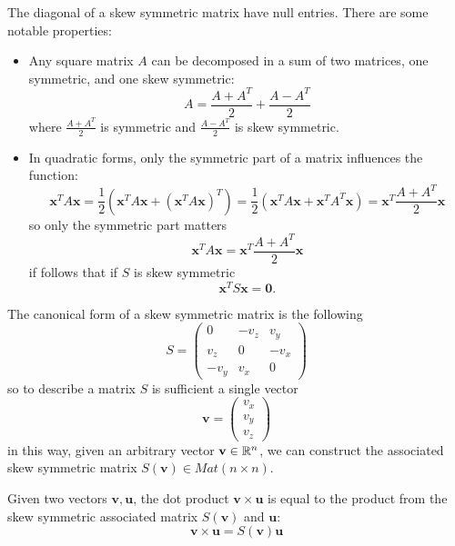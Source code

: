 \documentclass[10pt, letterpaper]{report}
\begin{document}
The diagonal of a skew symmetric matrix have null entries. There are some notable properties:\begin{itemize}
    \item Any square matrix $A$ can be decomposed in a sum of two matrices, one symmetric, and one skew symmetric:\begin{equation}
        A=\frac{A+A^T}{2}+\frac{A-A^T}{2}
    \end{equation}
    where $\frac{A+A^T}{2}$ is symmetric and $\frac{A-A^T}{2}$ is skew symmetric. 
    \item In quadratic forms, only the symmetric part of a matrix influences the function:\begin{equation}
        \mathbf x^T A \mathbf x = \frac{1}{2}(\mathbf x^T A \mathbf x+(\mathbf x^T A \mathbf x)^T)=\frac{1}{2}(\mathbf x^T A \mathbf x+\mathbf x^T A^T \mathbf x)=\mathbf x^T\frac{A+A^T}{2}\mathbf x
    \end{equation}
    so only the symmetric part matters\begin{equation}
        \mathbf x^T A\mathbf x=\mathbf x^T\frac{A+A^T}{2}\mathbf x
    \end{equation}
    if follows that if $S$ is skew symmetric \begin{equation}
        \mathbf x^T S\mathbf x=\mathbf 0.   
    \end{equation}
\end{itemize}
The canonical form of a skew symmetric matrix is the following\begin{equation}
    S=\begin{pmatrix}
        0&-v_z&v_y\\ 
        v_z&0&-v_x\\ 
        -v_y&v_x&0
    \end{pmatrix}
\end{equation}
so to describe a matrix $S$ is sufficient a single vector \begin{equation}
    \mathbf v=\begin{pmatrix}
        v_x\\ 
        v_y\\ 
        v_z
    \end{pmatrix}
\end{equation}
in this way, given an arbitrary vector $\mathbf v\in {\mathbb R}^n$, we can construct the associated skew symmetric matrix $S(\mathbf v)\in Mat(n\times n)$.
\begin{proposition}
    Given two vectors $\mathbf v,\mathbf u$, the dot product $\mathbf v\times \mathbf u$ is equal to the product from the skew symmetric associated matrix $S(\mathbf v)$ and $\mathbf u$:\begin{equation}
        \mathbf v\times \mathbf u=S(\mathbf v)\mathbf u
    \end{equation}
\end{proposition}
\end{document}
